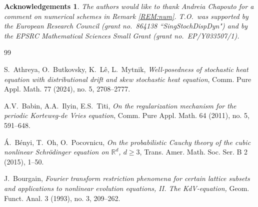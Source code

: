 \documentclass[letterpaper, 11pt,  reqno]{amsart}
\newcommand{\1}{\hspace{0.5mm}\text{I}\hspace{0.5mm}}
\newcommand{\R}{\mathbb{R}}
\newtheorem*{ackno}{Acknowledgements}
\numberwithin{equation}{section}
\numberwithin{theorem}{section}
\begin{document}
\begin{ackno}\rm
The authors would like to thank Andreia Chapouto
for a comment on numerical schemes
in Remark \ref{REM:num}.
T.O.~was supported by the European Research Council (grant no.~864138 ``SingStochDispDyn")
and  by the EPSRC 
Mathematical Sciences
Small Grant  (grant no.~EP/Y033507/1).


\end{ackno}







\begin{thebibliography}{99}




S.~Athreya, O.~Butkovsky, K.~L\^e, L.~Mytnik,
{\it Well-posedness of stochastic heat equation with distributional drift and skew stochastic heat equation},
Comm. Pure Appl. Math. 77 (2024), no. 5, 2708--2777.


A.V.~Babin, A.A.~Ilyin, E.S.~Titi,
{\it On the regularization mechanism for the periodic Korteweg-de Vries equation}, 
Comm. Pure Appl. Math. 64 (2011), no. 5, 591--648.



%


%
%
%




%
%
%



\'A.~B\'enyi, T.~Oh, O.~Pocovnicu,
{\it On the probabilistic Cauchy theory of the cubic nonlinear Schr\"odinger equation on $\R^d$, $d\ge 3$}, 
Trans. Amer. Math. Soc. Ser. B 2 (2015), 1--50. 




%
%
%





J.~Bourgain, 
{\it Fourier transform restriction phenomena for certain lattice subsets and applications to nonlinear evolution equations, II. The KdV-equation,} 
 Geom. Funct. Anal. 3 (1993), no. 3, 209--262.



\end{thebibliography}
\end{document}
